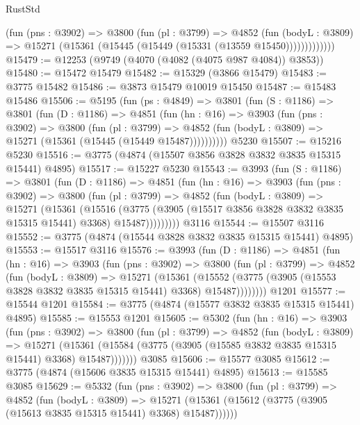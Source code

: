 \begin{lexlean}{RustStd}
\begin{coremodule}
              (fun (pns : @3902) =>
              @3800
                (fun (pl : @3799) =>
                @4852
                  (fun (bodyL : @3809) =>
                  @15271 (@15361 (@15445 (@15449 (@15331 (@13559 @15450)))))))))))))
@15479 := @12253 (@9749 (@4070 (@4082 (@4075 @987 @4084)) @3853))
@15480 := @15472 @15479
@15482 := @15329 (@3866 @15479)
@15483 := @3775 @15482
@15486 := @3873 @15479 @10019 @15450
@15487 := @15483 @15486
@15506 := @5195
    (fun (ps : @4849) =>
    @3801
      (fun (S : @1186) =>
      @3801
        (fun (D : @1186) =>
        @4851
          (fun (hn : @16) =>
          @3903
            (fun (pns : @3902) =>
            @3800
              (fun (pl : @3799) =>
              @4852 (fun (bodyL : @3809) => @15271 (@15361 (@15445 (@15449 @15487))))))))))
    @5230
@15507 := @15216 @5230
@15516 := @3775 (@4874 (@15507 @3856 @3828 @3832 @3835 @15315 @15441) @4895)
@15517 := @15227 @5230
@15543 := @3993
    (fun (S : @1186) =>
    @3801
      (fun (D : @1186) =>
      @4851
        (fun (hn : @16) =>
        @3903
          (fun (pns : @3902) =>
          @3800
            (fun (pl : @3799) =>
            @4852
              (fun (bodyL : @3809) =>
              @15271
                (@15361
                  (@15516
                    (@3775
                      (@3905 (@15517 @3856 @3828 @3832 @3835 @15315 @15441) @3368)
                      @15487)))))))))
    @3116
@15544 := @15507 @3116
@15552 := @3775 (@4874 (@15544 @3828 @3832 @3835 @15315 @15441) @4895)
@15553 := @15517 @3116
@15576 := @3993
    (fun (D : @1186) =>
    @4851
      (fun (hn : @16) =>
      @3903
        (fun (pns : @3902) =>
        @3800
          (fun (pl : @3799) =>
          @4852
            (fun (bodyL : @3809) =>
            @15271
              (@15361
                (@15552 (@3775 (@3905 (@15553 @3828 @3832 @3835 @15315 @15441) @3368) @15487))))))))
    @1201
@15577 := @15544 @1201
@15584 := @3775 (@4874 (@15577 @3832 @3835 @15315 @15441) @4895)
@15585 := @15553 @1201
@15605 := @5302
    (fun (hn : @16) =>
    @3903
      (fun (pns : @3902) =>
      @3800
        (fun (pl : @3799) =>
        @4852
          (fun (bodyL : @3809) =>
          @15271
            (@15361 (@15584 (@3775 (@3905 (@15585 @3832 @3835 @15315 @15441) @3368) @15487)))))))
    @3085
@15606 := @15577 @3085
@15612 := @3775 (@4874 (@15606 @3835 @15315 @15441) @4895)
@15613 := @15585 @3085
@15629 := @5332
    (fun (pns : @3902) =>
    @3800
      (fun (pl : @3799) =>
      @4852
        (fun (bodyL : @3809) =>
        @15271 (@15361 (@15612 (@3775 (@3905 (@15613 @3835 @15315 @15441) @3368) @15487))))))

\end{coremodule}
\end{lexlean}
